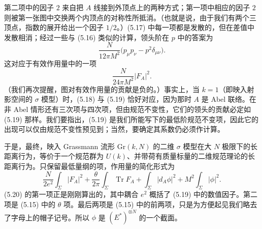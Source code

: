 第二项中的因子 $2$ 来自把 $A$ 线接到外顶点上的两种方式；第一项中相应的因子 $2$ 则被第一张图中交换两个内顶点的对称性所抵消。（也就是说，由于我们有两个三顶点，指数的展开给出一个因子 $1/2$。）(5.17) 中每一项都是发散的，但在差值中发散相消；经过一些与 (5.16) 类似的计算，领头阶在 $p$ 中的答案为
\begin{equation}
  \tag{5.18}
  \label{eq:5-18}
  \frac{N}{12\pi M^2}\bigl(p_\mu p_\nu-p^2\delta_{\mu\nu}\bigr).
\end{equation}
这对应于有效作用量中的一项
\begin{equation}
  \tag{5.19}
  \label{eq:5-19}
  \frac{N}{24\pi M^2}|F_A|^2 .
\end{equation}
（我们再次提醒，图对有效作用量的贡献是负的。）事实上，当 $k=1$（即映入射影空间的 $\sigma$ 模型）时，(5.18) 与 (5.19) 恰好对应，因为那时 $A$ 是 Abel 联络。在非 Abel 情形还有三次项与四次项，但由规范不变性，它们的领头的贡献必定如 (5.19) 那样。我们要指出，(5.19) 是我们所能写下的最低阶规范不变项，因此它的出现可以仅由规范不变性预见到；当然，要确定其系数仍必须作计算。



于是，最终，映入 Grassmann 流形 $\mathrm{Gr}(k,N)$ 的二维 $\sigma$ 模型在大 $N$ 极限下的长距离行为，等价于一个规范群为 $U(k)$、并带荷有质量标量的二维规范理论的长距离行为。只保留最低量纲的项，作用量的简化形式为
\begin{equation}
  \tag{5.20}
  \label{eq:5-20}
  \frac{N}{2e^2}\int_\Sigma|F_A|^2+\frac{\theta}{2\pi}\int_\Sigma\operatorname{Tr}F_A+\int_\Sigma|d_A\phi|^2+M^2\int_\Sigma|\phi|^2 .
\end{equation}
(5.20) 的第一项正是刚刚算出的，其中耦合 $e^2$ 概括了 (5.19) 中的数值因子。第二项是 (5.15) 中的 $\theta$ 项。最后两项是 (5.15) 中的前两项，只是为方便起见我们略去了字母上的帽子记号。所以 $\phi$ 是 $(E^*)^{\otimes N}$ 的一个截面。

